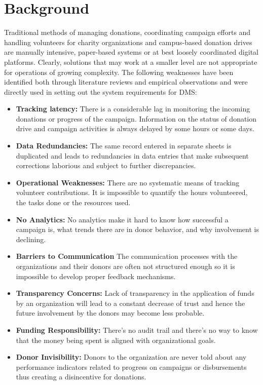 \documentclass{thesis-library}
\begin{document}
\section{Background}
Traditional methods of managing donations, coordinating campaign efforts and handling volunteers for charity organizations and campus-based donation drives are manually intensive, paper-based systems or at best loosely coordinated digital platforms. Clearly, solutions that may work at a smaller level are not appropriate for operations of growing complexity. The following weaknesses have been identified both through literature reviews and empirical observations and were directly used in setting out the system requirements for DMS:
\begin{itemize}
    \item \textbf{Tracking latency:} There is a considerable lag in monitoring the incoming donations or progress of the campaign. Information on the status of donation drive and campaign activities is always delayed by some hours or some days.
    \item \textbf{Data Redundancies:} The same record entered in separate sheets is duplicated and leads to redundancies in data entries that make subsequent corrections laborious and subject to further discrepancies.
    \item \textbf{Operational Weaknesses:}  There are no systematic means of tracking volunteer contributions. It is impossible to quantify the hours volunteered, the tasks done or the resources used.
    \item \textbf{No Analytics:} No analytics make it hard to know how successful a campaign is, what trends there are in donor behavior, and why involvement is declining.
    \item \textbf{Barriers to Communication} The communication processes with the organizations and their donors are often not structured enough so it is impossible to develop proper feedback mechanisms.
    \item \textbf{Transparency Concerns:} Lack of transparency in the application of funds by an organization will lead to a constant decrease of trust and hence the future involvement by the donors may become less probable.
    \item \textbf{Funding Responsibility:} There's no audit trail and there's no way to know that the money being spent is aligned with organizational goals.
    \item \textbf{Donor Invisibility:} Donors to the organization are never told about any performance indicators related to progress on campaigns or disbursements thus creating a disincentive for donations.

\end{itemize}
\end{document}
